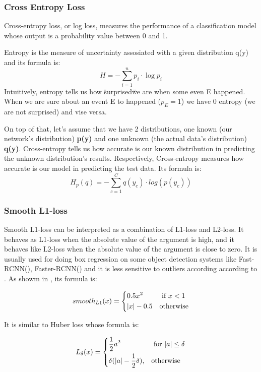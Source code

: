 \documentclass{report}
\begin{document}
\subsubsection{Cross Entropy Loss}
Cross-entropy loss, or log loss, measures the performance of a classification model whose output is a probability value between 0 and 1. \par
Entropy is the measure of uncertainty assosiated with a given distribution q(y) and its formula is: 
\[ H = -\sum_{i=1}^n p_i \cdot \log p_i \]
Intuitively, entropy tells us how \"surprised\" we are when some even E happened. When we are sure about an event E to happened ($ p_E = 1$)
we have 0 entropy (we are not surprised) and vise versa. \par
On top of that, let's assume that we have 2 distributions, one known (our network's distribution) \textbf{p(y)} and one unknown (the actual
data's distribution) \textbf{q(y)}. Cross-entropy tells us how accurate is our known distribution in predicting the unknown distribution's
results. Respectively, Cross-entropy measures how accurate is our model in predicting the test data. Its formula is:
\[ H_p(q) = - \sum_{c=1}^C q(y_c) \cdot log(p(y_c)) \]

\subsubsection{Smooth L1-loss}

Smooth L1-loss can be interpreted as a combination of L1-loss and L2-loss. It behaves as L1-loss when the absolute
value of the argument is high, and it behaves like L2-loss when the absolute value of the argument is close to zero.
It is usually used for doing box regression on some object detection systems like Fast-RCNN(\cite{Girshick:2015:FR:2919332.2920125}),
Faster-RCNN(\cite{Ren:2015:FRT:2969239.2969250}) and it is less sensitive to outliers according according to \cite{Girshick:2015:FR:2919332.2920125}.
As showm in \cite{Girshick:2015:FR:2919332.2920125}, its formula is:

\[ smooth_{L1}(x) = \begin{dcases}
    0.5x^2 & \text{ if } x < 1 \\
    |x| - 0.5 & \text{otherwise}
  \end{dcases}\]

It is similar to Huber loss whose formula is:

\[
L_{\delta}(x) = \begin{dcases}
    \frac{1}{2}a^2 & \text{ for } |a| \le \delta \\
\delta(|a| - \frac{1}{2}\delta), & \text{otherwise}
\end{dcases}
\]
\end{document}

